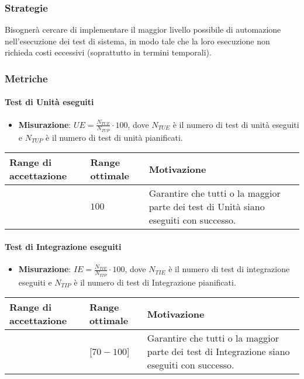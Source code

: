 \subsubsection{Strategie}
Bisognerà cercare di implementare il maggior livello possibile di automazione nell'esecuzione dei test di sistema, in modo tale che la loro esecuzione non richieda costi eccessivi (soprattutto in termini temporali).

\subsubsection{Metriche}

\paragraph{Test di Unità eseguiti}

\begin{itemize}
\item \textbf{Misurazione}: $UE=\frac{N_{TUE}}{N_{TUP}} \cdot 100$, dove $N_{TUE}$ è il numero di test di unità eseguiti e $N_{TUP}$ è il numero di test di unità pianificati.
\end{itemize}

\begin{center}
		\begin{tabular}{|P{2.5cm}|P{2.5cm}|P{6cm}|}
		\hline
			\textbf{Range di accettazione}	& \textbf{Range ottimale} & \textbf{Motivazione} \\
			\hline
			[$90 - 100$] & $100$ &	Garantire che tutti o la maggior parte dei test di Unità siano eseguiti con successo. \\
			\hline
			\end{tabular}
\end{center}


\paragraph{Test di Integrazione eseguiti}

\begin{itemize}
\item \textbf{Misurazione}: $IE=\frac{N_{TIE}}{N_{TIP}} \cdot 100$, dove $N_{TIE}$ è il numero di test di integrazione eseguiti e $N_{TIP}$ è il numero di test di Integrazione pianificati.
\end{itemize}

\begin{center}
		\begin{tabular}{|P{2.5cm}|P{2.5cm}|P{6cm}|}
		\hline
			\textbf{Range di accettazione}	& \textbf{Range ottimale} & \textbf{Motivazione} \\
			\hline
			[$60 - 100$] & [$70 - 100$] &	Garantire che tutti o la maggior parte dei test di Integrazione siano eseguiti con successo. \\
			\hline
			\end{tabular}
\end{center}


